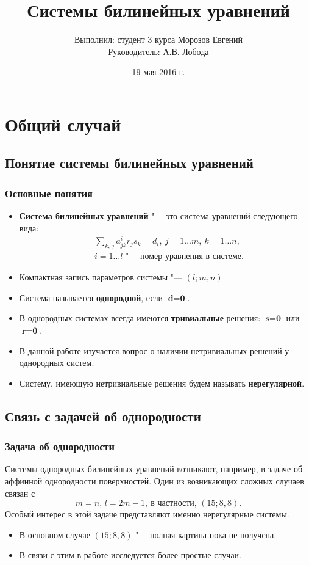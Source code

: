 \documentclass[russian,hyperref={unicode}]{beamer}
\title{Системы билинейных уравнений}
\institute
{
	Воронежский Государственный Университет \\
	Факультет Компьютерных Наук \\
	Кафедра Цифровых Технологий
}
\author
{
	Выполнил: студент 3 курса Морозов Евгений \\
	Руководитель: А.В. Лобода
}
\date{19 мая 2016 г.}
\begin{document}
\frame{\titlepage}


\section{Общий случай}
\subsection{Понятие системы билинейных уравнений}
\frame
{
  \frametitle{Основные понятия}
  
	\begin{itemize}
		\item \textbf{Система билинейных уравнений} "--- это система уравнений следующего 
			вида:
			\begin{align*}
				&\sum_{k,\,j}a^{i}_{jk} r_j s_k = d_i,~j=1 \dots m,~k=1 \dots n, \\
				& i = 1 \dots l \text{ "--- номер уравнения в системе.}
			\end{align*}
		\item Компактная запись параметров системы "--- $(l; m, n)$
		\item Система называется \textbf{однородной}, если $\textbf{d} = \textbf{0}$. 
	 	\item В однородных 	системах всегда имеются \textbf{тривиальные} решения: 
			$ \textbf{s} = \textbf{0}$ или $\textbf{r} = \textbf{0} $.
		\item В данной работе изучается вопрос о наличии нетривиальных решений у 
		однородных систем.
		\item Систему, имеющую нетривиальные решения будем называть 
		\textbf{нерегулярной}.
	\end{itemize}
}
\subsection{Связь с задачей об однородности}
\frame
{
	\frametitle{Задача об однородности}
	
	Системы однородных билинейных уравнений  возникают, например,
	в задаче об аффинной однородности поверхностей. Один из возникающих сложных случаев 
	связан с 
	$$m = n,\,l = 2m - 1,~\text{в частности, } (15; 8, 8).$$ 
	Особый интерес в этой задаче представляют именно нерегулярные системы.
	\begin{itemize}
		\item В основном случае $(15; 8, 8)$ "--- полная картина пока не получена.
		\item В связи с этим в работе исследуется более простые случаи.
	\end{itemize}
}
\end{document}
